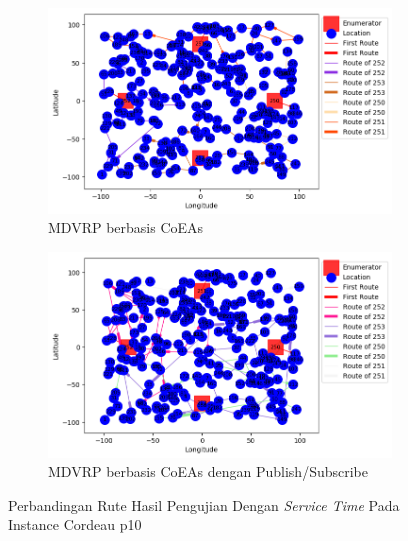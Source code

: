 \begin{figure}[H]
	\centering
	\begin{subfigure}[t]{\textwidth}
		\centering
		\includegraphics[width=\textwidth]{Resources/Images/cordeau_p10_tw/cordeau_p10_tw_coes}
		\caption{MDVRP berbasis CoEAs}
		\label{fig:cordeau_p10_tw_coes}
	\end{subfigure}
	\begin{subfigure}[t]{\textwidth}
		\centering
		\includegraphics[width=\textwidth]{Resources/Images/cordeau_p10_tw/cordeau_p10_tw_pubsub_coes}
		\caption{MDVRP berbasis CoEAs dengan Publish/Subscribe}
		\label{fig:cordeau_p10_tw_pubsub_coes}
	\end{subfigure}
	\caption{Perbandingan Rute Hasil Pengujian Dengan \textit{Service Time} Pada Instance Cordeau p10}
	\label{fig:cordeau_p10_tw}
\end{figure}


